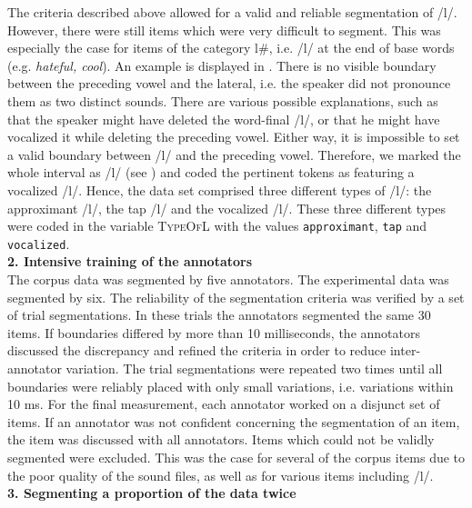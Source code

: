 The criteria described above allowed for a valid and reliable segmentation of /l/. However, there were still items which were very difficult to segment. This was especially the case for items of the category l\#, i.e. /l/ at the end of base words (e.g. \textit{hateful, cool}). An example is displayed in . There is no visible boundary between the preceding vowel and the lateral, i.e. the speaker did not pronounce them as two distinct sounds. There are various possible explanations, such as that the speaker might have deleted the word-final /l/, or that he might have vocalized it  while deleting the preceding vowel. Either way,  it is impossible to set a valid boundary between /l/ and the preceding vowel. Therefore, we marked the whole interval as /l/ (see ) and coded the pertinent tokens as featuring a vocalized /l/. Hence, the data set comprised three different types of /l/: the approximant /l/, the tap /l/ and the vocalized /l/. These three different types were coded in the variable \textsc{TypeOfL} with the values \texttt{approximant}, \texttt{tap} and \texttt{vocalized}.\\



\textbf{ 2.  Intensive training of the annotators}\\

The corpus data was segmented by five annotators. The experimental data was segmented by six. The reliability of the segmentation criteria was verified by a set of trial segmentations.  In these trials the annotators segmented the same 30 items. If boundaries differed by more than 10 milliseconds, the annotators discussed the discrepancy and refined the criteria in order to reduce inter-annotator variation. The trial segmentations were repeated two times until all boundaries were reliably placed with only small variations, i.e. variations within 10 ms. For the final measurement, each annotator worked on a disjunct set of items. If an annotator was not confident concerning the segmentation of an item, the item was discussed with all annotators. Items which could not be validly segmented were excluded. This was the case for several of the corpus items due to the poor quality of the sound files, as well as for various items including /l/. \\%

\textbf{ 3. Segmenting a proportion of the data twice}\\

